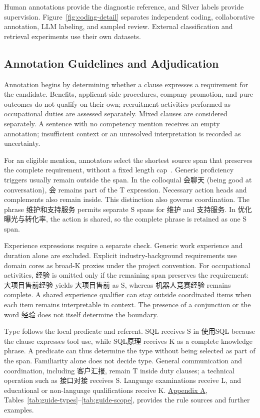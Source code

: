 Human annotations provide the diagnostic reference, and Silver labels provide supervision. Figure~\ref{fig:coding-detail} separates independent coding, collaborative annotation, LLM labeling, and sampled review. External classification and retrieval experiments use their own datasets.





\subsection{Annotation Guidelines and Adjudication}
\label{sec:annotation-guidelines-r36}

Annotation begins by determining whether a clause expresses a requirement for the candidate. Benefits, applicant-side procedures, company promotion, and pure outcomes do not qualify on their own; recruitment activities performed as occupational duties are assessed separately. Mixed clauses are considered separately. A sentence with no competency mention receives an empty annotation; insufficient context or an unresolved interpretation is recorded as uncertainty.

For an eligible mention, annotators select the shortest source span that preserves the complete requirement, without a fixed length cap~\citep{zhang2022skillspan}. Generic proficiency triggers usually remain outside the span. In the colloquial 会聊天 (being good at conversation), 会 remains part of the T expression. Necessary action heads and complements also remain inside. This distinction also governs coordination. The phrase 维护和支持服务 permits separate S spans for 维护 and 支持服务. In 优化曝光与转化率, the action is shared, so the complete phrase is retained as one S span.

Experience expressions require a separate check. Generic work experience and duration alone are excluded. Explicit industry-background requirements use domain cores as broad-K proxies under the project convention. For occupational activities, 经验 is omitted only if the remaining span preserves the requirement: 大项目售前经验 yields 大项目售前 as S, whereas 机器人竞赛经验 remains complete. A shared experience qualifier can stay outside coordinated items when each item remains interpretable in context. The presence of a conjunction or the word 经验 does not itself determine the boundary.

Type follows the local predicate and referent. SQL receives S in 使用SQL because the clause expresses tool use, while SQL原理 receives K as a complete knowledge phrase. A predicate can thus determine the type without being selected as part of the span. Familiarity alone does not decide type. General communication and coordination, including 客户汇报, remain T inside duty clauses; a technical operation such as 接口对接 receives S. Language examinations receive L, and educational or non-language qualifications receive K. \hyperref[app:a]{Appendix A}, Tables~\ref{tab:guide-types}--\ref{tab:guide-scope}, provides the rule sources and further examples.

